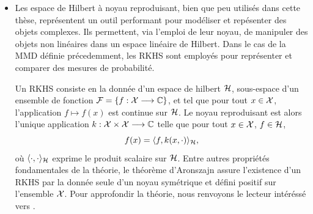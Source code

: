 \begin{itemize}
    Bien sûr, il existe aussi de nombreuses mesures de dissimilarité qui ne sont pas des $f$-divergences, à ce titre, les indices de Sobol' du premier ordre évoqués plus haut font office d'exemple. Un autre exemple notable présenté ici est celui des normes maximales de discrépances (MMD). Soient $P$, $Q$ deux mesures de probabilité définies sur un ensemble $\cX$, et soit $\cH$ un espace de Hilbert à noyau reproduisant (RKHS~; un rappel sur cette notion et ses définitions est proposé dans le point suivant) sur $\cX$,  dont le noyau reproduisant est noté $k:\cX\times\cX\to\CC$. %
    On définit la MMD (\cite{gretton_kernel_2012}) par
        \begin{equation}
            \text{MMD}(\cH;\,P||Q) = \sup_{\substack{f\in\cH\\ \|f\|_\cH\leq1}} |\EE_{X\sim P}f(X) - \EE_{X\sim Q}f(X)|,
        \end{equation}
    ou, dans une forme plus simple :
        \begin{equation}
            \text{MMD}^2(\cH;\,P||Q) = \EE_{X,X'\sim P\otimes P}[k(X,X')] + \EE_{Y,Y'\sim Q\otimes Q}[k(Y,Y')] - 2\EE_{X,Y\sim P\otimes Q}[k(X,Y)].
        \end{equation}

    \item Les espace de Hilbert à noyau reproduisant, bien que peu utilisés dans cette thèse, représentent un outil performant 
   pour modéliser et repésenter des objets complexes.
   Ils permettent, via l'emploi de leur noyau, de manipuler des objets non linéaires dans un espace linéaire de Hilbert.
        Dans le cas de la MMD définie précedemment, les RKHS sont employés pour représenter et comparer des mesures de probabilité.

        Un RKHS consiste en la donnée d'un espace de hilbert $\cH$, sous-espace d'un ensemble de fonction $\mathcal{F}=\{f:\mathcal{X}\longrightarrow\mathbb{C}\}$, et tel que pour tout $x\in\mathcal{X}$, l'application $f\mapsto f(x)$ est continue sur $\cH$.
        Le noyau reproduisant est alors l'unique application $k:\cX\times\cX\to\CC$ telle que pour tout $x\in\mathcal{X}$, $f\in\mathcal{H}$, 
            \begin{equation}
                f(x)= \langle f,k(x,\cdot) \rangle_{\mathcal{H}},
            \end{equation}
        où $\langle\cdot,\cdot\rangle_{\mathcal{H}}$ exprime le produit scalaire sur $\cH$. %
        Entre autres propriétés fondamentales de la théorie, le théorème d'Aronszajn \citep{aronszajn_theory_1950} assure l'existence d'un RKHS par la donnée seule d'un noyau symétrique et défini positif sur l'ensemble $\cX$. Pour approfondir la théorie, nous renvoyons le lecteur intéréssé vers \cite{scholkopf_learning_2001}.
        

\end{itemize}

